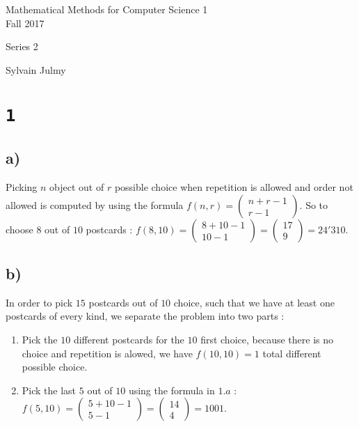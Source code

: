 \documentclass[a4paper,11pt]{report}
\author{Sylvain Julmy}
\date{\today}
\begin{document}
\begin{center}
  \Large{
    Mathematical Methods for Computer Science 1\\
    Fall 2017
  }
  \noindent\makebox[\linewidth]{\rule{\linewidth}{0.4pt}}

  Series 2
  \vspace*{1.4cm}

  Sylvain Julmy
  
  \noindent\makebox[\linewidth]{\rule{\linewidth}{0.4pt}}
\end{center}

\section*{\texttt{1}}
\subsection*{a)}
Picking $n$ object out of $r$ possible choice when repetition is allowed and
order not allowed is computed by using the formula $f(n,r) = \begin{pmatrix}n + r - 1 \\
  r - 1\end{pmatrix}$. So to choose $8$ out of $10$ postcards : $f(8,10)
= \begin{pmatrix} 8+10-1\\ 10-1\end{pmatrix} = \begin{pmatrix} 17\\
  9\end{pmatrix} = 24'310$.

\subsection*{b)}

In order to pick $15$ postcards out of $10$ choice, such that we have at least
one postcards of every kind, we separate the problem into two parts :
\begin{enumerate}
\item Pick the $10$ different postcards for the $10$ first choice, because there
  is no choice and repetition is alowed, we have $f(10,10) = 1$ total different
  possible choice.
\item Pick the last $5$ out of $10$ using the formula in $1.a$ : $f(5,10)
  = \begin{pmatrix} 5 + 10 - 1 \\ 5 - 1\end{pmatrix} = \begin{pmatrix} 14 \\
    4\end{pmatrix} = 1001$.
\end{enumerate}
\end{document}
